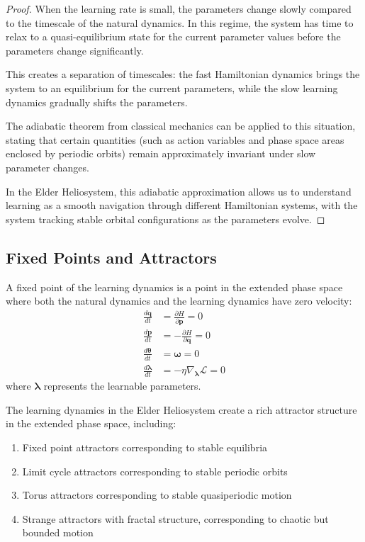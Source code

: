 \begin{proof}
When the learning rate is small, the parameters change slowly compared to the timescale of the natural dynamics. In this regime, the system has time to relax to a quasi-equilibrium state for the current parameter values before the parameters change significantly.

This creates a separation of timescales: the fast Hamiltonian dynamics brings the system to an equilibrium for the current parameters, while the slow learning dynamics gradually shifts the parameters.

The adiabatic theorem from classical mechanics can be applied to this situation, stating that certain quantities (such as action variables and phase space areas enclosed by periodic orbits) remain approximately invariant under slow parameter changes.

In the Elder Heliosystem, this adiabatic approximation allows us to understand learning as a smooth navigation through different Hamiltonian systems, with the system tracking stable orbital configurations as the parameters evolve.
\end{proof}

\subsection{Fixed Points and Attractors}

\begin{definition}
A fixed point of the learning dynamics is a point in the extended phase space where both the natural dynamics and the learning dynamics have zero velocity:
\begin{align}
\frac{d\mathbf{q}}{dt} &= \frac{\partial H}{\partial \mathbf{p}} = 0 \\
\frac{d\mathbf{p}}{dt} &= -\frac{\partial H}{\partial \mathbf{q}} = 0 \\
\frac{d\boldsymbol{\theta}}{dt} &= \boldsymbol{\omega} = 0 \\
\frac{d\boldsymbol{\lambda}}{dt} &= -\eta \nabla_{\boldsymbol{\lambda}} \mathcal{L} = 0
\end{align}
where $\boldsymbol{\lambda}$ represents the learnable parameters.
\end{definition}

\begin{theorem}
The learning dynamics in the Elder Heliosystem create a rich attractor structure in the extended phase space, including:
\begin{enumerate}
    \item Fixed point attractors corresponding to stable equilibria
    \item Limit cycle attractors corresponding to stable periodic orbits
    \item Torus attractors corresponding to stable quasiperiodic motion
    \item Strange attractors with fractal structure, corresponding to chaotic but bounded motion
\end{enumerate}
\end{theorem}

